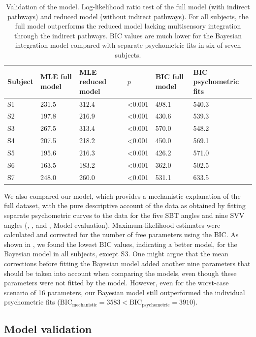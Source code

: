 \begin{table}
\begin{tabular}{llllll}
\hline
Subject & MLE full model & MLE reduced model & $p$ & BIC full model & BIC psychometric fits \\
\hline
S1 & 231.5 & 312.4 & \textless 0.001 & 498.1 & 540.3 \\
S2 & 197.8 & 216.9 & \textless 0.001 & 430.6 & 539.3 \\
S3 & 267.5 & 313.4 & \textless 0.001 & 570.0 & 548.2 \\
S4 & 207.5 & 218.2 & \textless 0.001 & 450.0 & 569.1 \\
S5 & 195.6 & 216.3 & \textless 0.001 & 426.2 & 571.0 \\
S6 & 163.5 & 183.2 & \textless 0.001 & 362.0 & 502.5 \\
S7 & 248.0 & 260.0 & \textless 0.001 & 531.1 & 633.5 \\ 
\end{tabular}
\caption{Validation of the model. Log-likelihood ratio test of the full model (with indirect pathways) and reduced model (without indirect pathways). For all subjects, the full model outperforms the reduced model lacking multisensory integration through the indirect pathways. BIC values are much lower for the Bayesian integration model compared with separate psychometric fits in six of seven subjects.}
\label{p1:tab2}
\end{table}

We also compared our model, which provides a mechanistic explanation of the full dataset, with the pure descriptive account of the data as obtained by fitting separate psychometric curves to the data for the five SBT angles and nine SVV angles (, , and , Model evaluation). Maximum-likelihood estimates were calculated and corrected for the number of free parameters using the BIC. As shown in , we found the lowest BIC values, indicating a better model, for the Bayesian model in all subjects, except S3. One might argue that the mean corrections before fitting the Bayesian model added another nine parameters that should be taken into account when comparing the models, even though these parameters were not fitted by the model. However, even for the worst-case scenario of 16 parameters, our Bayesian model still outperformed the individual psychometric fits ($\text{BIC}_\text{mechanistic} = 3583 < \text{BIC}_\text{psychometric} = \text{3910}$). 

\subsection{Model validation}
 
